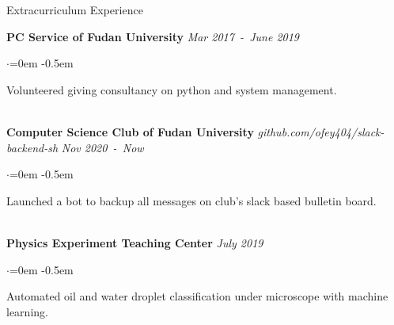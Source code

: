 \documentclass{resume} %
\begin{document}
\begin{rSection}{Extracurriculum Experience}

{\bf PC Service of Fudan University } \hfill {\em Mar 2017\ -\ June 2019}

  \begin{list}{$\cdot$}{\leftmargin=0em} %
   \itemsep -0.5em \vspace{-0.5em} %
\item Volunteered giving consultancy on python and system management.

  \end{list}
  
\\ {\bf Computer Science Club of Fudan University } {\em github.com/ofey404/slack-backend-sh } \hfill {\em Nov 2020\ -\ Now }

  \begin{list}{$\cdot$}{\leftmargin=0em} %
   \itemsep -0.5em \vspace{-0.5em} %
\item Launched a bot to backup all messages on club's slack based bulletin board.
  \end{list}
  
\\ {\bf Physics Experiment Teaching Center } \hfill {\em July 2019}

  \begin{list}{$\cdot$}{\leftmargin=0em} %
   \itemsep -0.5em \vspace{-0.5em} %
\item Automated oil and water droplet classification under microscope with machine learning.
  \end{list}
  
% 


\end{rSection}



\end{document}

